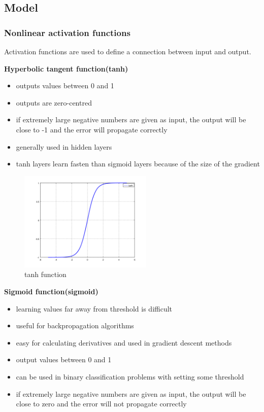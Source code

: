 \subsection{Model}
\label{model}

\subsubsection{Nonlinear activation functions\cite{david,hiddenfunctions,backprop}}
\label{transfer}
Activation functions are used to define a connection between input and output.

\textbf{Hyperbolic tangent function(tanh)}
\begin{itemize}
	\item outputs values between 0 and 1
	\item outputs are zero-centred
	\item if extremely large negative numbers are given as input, the output will be close to -1 and the error will propagate correctly
	\item generally used in hidden layers
	\item tanh layers learn fasten than sigmoid layers because of the size of the gradient
\end{itemize}

\begin{figure}[h]
	\begin{center}
		\includegraphics[width=240px,height=180px]{src/img/state/tanh}
		\caption{tanh function} \label{fig:tanh}
    \end{center}
\end{figure}


\textbf{Sigmoid function(sigmoid)}
\begin{itemize}
  \item learning values far away from threshold is difficult
  \item useful for backpropagation algorithms
  \item easy for calculating derivatives and used in gradient descent methods
  \item output values between 0 and 1
  \item can be used in binary classification problems with setting some threshold
  \item if extremely large negative numbers are given as input, the output will be close to zero and the error will not propagate correctly
\end{itemize}

